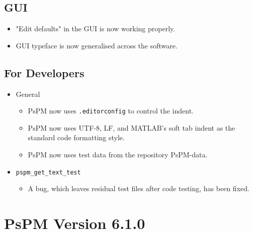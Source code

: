\documentclass[english]{article}
\numberwithin{equation}{section}
\numberwithin{figure}{section}
\begin{document}
\subsection*{GUI}
\begin{itemize}
\item "Edit defaults" in the GUI is now working properly.
\item GUI typeface is now generalised across the software.
\end{itemize}

\subsection*{For Developers}
\begin{itemize}
\item General
  \begin{itemize}
  \item PsPM now uses \texttt{.editorconfig} to control the indent.
  \item PsPM now uses UTF-8, LF, and MATLAB's soft tab indent as the standard code formatting style.
  \item PsPM now uses test data from the repository PsPM-data.
  \end{itemize}
\item \texttt{pspm\_get\_text\_test}
  \begin{itemize}
  \item A bug, which leaves residual test files after code testing, has been fixed.
  \end{itemize}
\end{itemize}

\section{PsPM Version 6.1.0}



\end{document}
